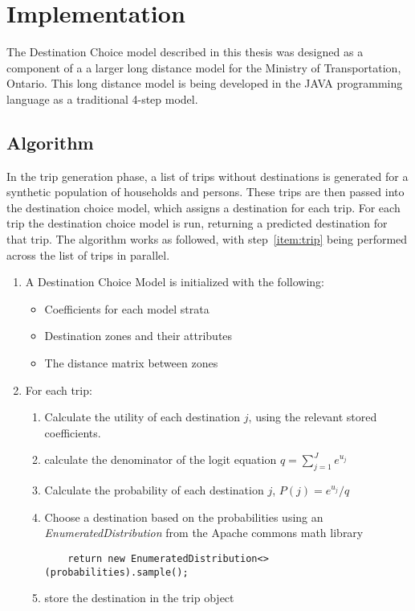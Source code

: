 \section{Implementation}
\label{section:implementation}
The Destination Choice model described in this thesis was designed as a component of a a larger long distance model for the Ministry of Transportation, Ontario. This long distance model is being developed in the JAVA programming language as a traditional 4-step model. 

\subsection{Algorithm}
In the trip generation phase, a list of trips without destinations is generated for a synthetic population of households and persons. These trips are then passed into the destination choice model, which assigns a destination for each trip. For each trip the destination choice model is run, returning a predicted destination for that trip. The algorithm works as followed, with step~\ref{item:trip} being performed across the list of trips in parallel.
\begin{enumerate}
\item A Destination Choice Model is initialized with the following:
	\begin{itemize}
	\item Coefficients for each model strata
	\item Destination zones and their attributes
	\item The distance matrix between zones
	\end{itemize}
\item \label{item:trip} For each trip:
	\begin{enumerate}
	\item Calculate the utility of each destination $j$, using the relevant stored coefficients.
	\item \label{item:denom} calculate the denominator of the logit equation $q = {\sum_{j=1}^{J} e^{u_j}}
	$
	\item Calculate the probability of each destination $j$, $P(j) = e^{u_j} / q $
	\item Choose a destination based on the probabilities using an \textit{EnumeratedDistribution} from the Apache commons math library 
	\begin{verbatim}
	return new EnumeratedDistribution<>(probabilities).sample();
	\end{verbatim}

	\item store the destination in the trip object
	\end{enumerate}
\end{enumerate}

